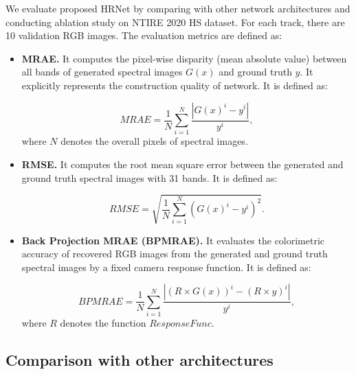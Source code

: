 \documentclass[10pt,twocolumn,letterpaper]{article}
\begin{document}
We evaluate proposed HRNet by comparing with other network architectures and conducting ablation study on NTIRE 2020 HS dataset. For each track, there are 10 validation RGB images. The evaluation metrics are defined as:

\begin{itemize}

\item \textbf{MRAE.} It computes the pixel-wise disparity (mean absolute value) between all bands of generated spectral images $G(x)$ and ground truth $y$. It explicitly represents the construction quality of network. It is defined as:

\begin{equation}
MRAE = \frac{1}{N} \sum_{i=1}^{N}\frac{|G(x)^{i} - y^{i}|}{y^{i}},
\end{equation}
where $N$ denotes the overall pixels of spectral images.

\item \textbf{RMSE.} It computes the root mean
square error between the generated and ground truth spectral images with 31 bands. It is defined as:

\begin{equation}
RMSE = \sqrt{ \frac{1}{N} \sum_{i=1}^{N} (G(x)^{i} - y^{i})^2 } .
\end{equation}

\item \textbf{Back Projection MRAE (BPMRAE).} It evaluates the colorimetric accuracy of recovered RGB images from the generated and ground truth spectral images by a fixed camera response function. It is defined as:

\begin{equation}
BPMRAE = \frac{1}{N} \sum_{i=1}^{N}\frac{|(R \times G(x))^{i} - (R \times y)^{i}|}{y^{i}},
\end{equation}
where $R$ denotes the function $ResponseFunc$.

\end{itemize}

\subsection{Comparison with other architectures}
\end{document}
